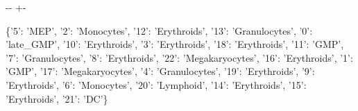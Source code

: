 \documentclass[letterpaper,10pt,english]{sphinxmanual}
\newlength\nbsphinxcodecellspacing
\begin{document}
{

\kern-\sphinxverbatimsmallskipamount\kern-\baselineskip
\kern+\FrameHeightAdjust\kern-\fboxrule
\vspace{\nbsphinxcodecellspacing}

\begin{sphinxVerbatim}[commandchars=\\\{\}]
\llap{\color{nbsphinxout}[22]:\,\hspace{\fboxrule}\hspace{\fboxsep}}\{'5': 'MEP',
 '2': 'Monocytes',
 '12': 'Erythroids',
 '13': 'Granulocytes',
 '0': 'late\_GMP',
 '10': 'Erythroids',
 '3': 'Erythroids',
 '18': 'Erythroids',
 '11': 'GMP',
 '7': 'Granulocytes',
 '8': 'Erythroids',
 '22': 'Megakaryocytes',
 '16': 'Erythroids',
 '1': 'GMP',
 '17': 'Megakaryocytes',
 '4': 'Granulocytes',
 '19': 'Erythroids',
 '9': 'Erythroids',
 '6': 'Monocytes',
 '20': 'Lymphoid',
 '14': 'Erythroids',
 '15': 'Erythroids',
 '21': 'DC'\}
\end{sphinxVerbatim}
}

{
\begin{sphinxVerbatim}[commandchars=\\\{\}]
\llap{\color{nbsphinxin}[23]:\,\hspace{\fboxrule}\hspace{\fboxsep}}\PYG{p}{[}\PYG{p}{]}  \PYG{p}{[}\PYG{p}{[}\PYG{p}{]}    \PYG{p}{]}
\end{sphinxVerbatim}
}

{
\begin{sphinxVerbatim}[commandchars=\\\{\}]
\llap{\color{nbsphinxin}[24]:\,\hspace{\fboxrule}\hspace{\fboxsep}}
 \PYG{p}{[} \PYG{p}{]}
\end{sphinxVerbatim}
}
\end{document}
